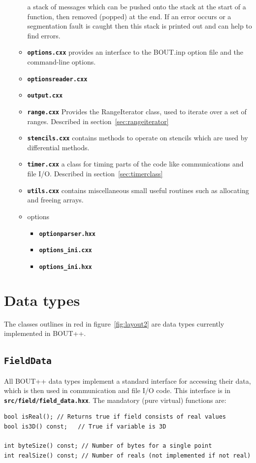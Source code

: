 \documentclass[12pt]{article}
\newcommand{\code}[1]{\texttt{#1}}
\newcommand{\file}[1]{\texttt{\bf #1}}
\begin{document}
\begin{itemize}
\begin{itemize}
    a stack of messages which can be pushed onto the stack at the start of 
    a function, then removed (popped) at the end. If an error occurs or 
    a segmentation fault is caught then this stack is printed out and can
    help to find errors.
  \item \file{options.cxx} provides an interface to the BOUT.inp option file
    and the command-line options.
  \item \file{optionsreader.cxx}
  \item \file{output.cxx}
  \item \file{range.cxx} Provides the RangeIterator class, used to iterate over a set
    of ranges. Described in section~\ref{sec:rangeiterator}
  \item \file{stencils.cxx} contains methods to operate on stencils which are
    used by differential methods. 
  \item \file{timer.cxx} a class for timing parts of the code like communications
    and file I/O. Described in section~\ref{sec:timerclass}
  \item \file{utils.cxx} contains miscellaneous small useful routines
    such as allocating and freeing arrays.
  \item options
    \begin{itemize}
    \item \file{optionparser.hxx}
    \item \file{options\_ini.cxx}
    \item \file{options\_ini.hxx}
    \end{itemize}
  \end{itemize}
\end{itemize}

\section{Data types}

The classes outlines in red in figure~\ref{fig:layout2} are data types 
currently implemented in BOUT++. 

\subsection{\code{FieldData}}
All BOUT++ data types implement a standard interface for accessing their
data, which is then used in communication and file I/O code. This interface
is in \file{src/field/field\_data.hxx}. The mandatory (pure virtual) functions are:
\begin{lstlisting}
bool isReal(); // Returns true if field consists of real values
bool is3D() const;   // True if variable is 3D
  
int byteSize() const; // Number of bytes for a single point
int realSize() const; // Number of reals (not implemented if not real)
\end{lstlisting}
\end{document}
